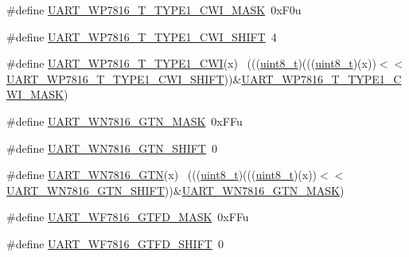 \begin{DoxyCompactItemize}
\item 
\#define \hyperlink{group___u_a_r_t___register___masks_gac187226c5d0a1c13888f04cb6fd837b1}{U\+A\+R\+T\+\_\+\+W\+P7816\+\_\+\+T\+\_\+\+T\+Y\+P\+E1\+\_\+\+C\+W\+I\+\_\+\+M\+A\+SK}~0x\+F0u
\item 
\#define \hyperlink{group___u_a_r_t___register___masks_gad9cb85843e4cabc17e896f27901df941}{U\+A\+R\+T\+\_\+\+W\+P7816\+\_\+\+T\+\_\+\+T\+Y\+P\+E1\+\_\+\+C\+W\+I\+\_\+\+S\+H\+I\+FT}~4
\item 
\#define \hyperlink{group___u_a_r_t___register___masks_ga4cb9f622991bfa7cb755952d5e4bf430}{U\+A\+R\+T\+\_\+\+W\+P7816\+\_\+\+T\+\_\+\+T\+Y\+P\+E1\+\_\+\+C\+WI}(x)                          ~(((\hyperlink{_p_e___types_8h_aba7bc1797add20fe3efdf37ced1182c5}{uint8\+\_\+t})(((\hyperlink{_p_e___types_8h_aba7bc1797add20fe3efdf37ced1182c5}{uint8\+\_\+t})(x))$<$$<$\hyperlink{group___u_a_r_t___register___masks_gad9cb85843e4cabc17e896f27901df941}{U\+A\+R\+T\+\_\+\+W\+P7816\+\_\+\+T\+\_\+\+T\+Y\+P\+E1\+\_\+\+C\+W\+I\+\_\+\+S\+H\+I\+FT}))\&\hyperlink{group___u_a_r_t___register___masks_gac187226c5d0a1c13888f04cb6fd837b1}{U\+A\+R\+T\+\_\+\+W\+P7816\+\_\+\+T\+\_\+\+T\+Y\+P\+E1\+\_\+\+C\+W\+I\+\_\+\+M\+A\+SK})
\item 
\#define \hyperlink{group___u_a_r_t___register___masks_ga2ca85f017d51ef94ac685ce60d365795}{U\+A\+R\+T\+\_\+\+W\+N7816\+\_\+\+G\+T\+N\+\_\+\+M\+A\+SK}~0x\+F\+Fu
\item 
\#define \hyperlink{group___u_a_r_t___register___masks_gab7deaf09ea769ec9cb28b66bfc90d141}{U\+A\+R\+T\+\_\+\+W\+N7816\+\_\+\+G\+T\+N\+\_\+\+S\+H\+I\+FT}~0
\item 
\#define \hyperlink{group___u_a_r_t___register___masks_ga87958ce2f4488cdd8d895aaeda7cf557}{U\+A\+R\+T\+\_\+\+W\+N7816\+\_\+\+G\+TN}(x)                                          ~(((\hyperlink{_p_e___types_8h_aba7bc1797add20fe3efdf37ced1182c5}{uint8\+\_\+t})(((\hyperlink{_p_e___types_8h_aba7bc1797add20fe3efdf37ced1182c5}{uint8\+\_\+t})(x))$<$$<$\hyperlink{group___u_a_r_t___register___masks_gab7deaf09ea769ec9cb28b66bfc90d141}{U\+A\+R\+T\+\_\+\+W\+N7816\+\_\+\+G\+T\+N\+\_\+\+S\+H\+I\+FT}))\&\hyperlink{group___u_a_r_t___register___masks_ga2ca85f017d51ef94ac685ce60d365795}{U\+A\+R\+T\+\_\+\+W\+N7816\+\_\+\+G\+T\+N\+\_\+\+M\+A\+SK})
\item 
\#define \hyperlink{group___u_a_r_t___register___masks_gafe82535b1014fd5cc4cfd50169d743ac}{U\+A\+R\+T\+\_\+\+W\+F7816\+\_\+\+G\+T\+F\+D\+\_\+\+M\+A\+SK}~0x\+F\+Fu
\item 
\#define \hyperlink{group___u_a_r_t___register___masks_ga721ba0567ed0305bffa0ee30353aa2c8}{U\+A\+R\+T\+\_\+\+W\+F7816\+\_\+\+G\+T\+F\+D\+\_\+\+S\+H\+I\+FT}~0

\end{DoxyCompactItemize}
